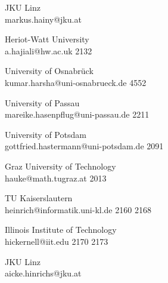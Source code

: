 \begin{multicols}{2}
 {JKU Linz\\}%
 {markus.hainy@jku.at}%
 {} %
 {} %
 {} %
 {} %
 {} %

 {Heriot-Watt University\\}%
 {a.hajiali@hw.ac.uk}%
 {2132} %
 {} %
 {} %
 {} %
 {} %

 {University of Osnabr\"uck\\}%
 {kumar.harsha@uni-osnabrueck.de}%
 {4552} %
 {} %
 {} %
 {} %
 {} %

 {University of Passau\\}%
 {mareike.hasenpflug@uni-passau.de}%
 {2211} %
 {} %
 {} %
 {} %
 {} %

 {University of Potsdam\\}%
 {gottfried.hastermann@uni-potsdam.de}%
 {2091} %
 {} %
 {} %
 {} %
 {} %

 {Graz University of Technology\\}%
 {hauke@math.tugraz.at}%
 {2013} %
 {} %
 {} %
 {} %
 {} %

 {TU Kaiserslautern\\}%
 {heinrich@informatik.uni-kl.de}%
 {2160} %
 {2168} %
 {} %
 {} %
 {} %

 {Illinois Institute of Technology\\}%
 {hickernell@iit.edu}%
 {2170} %
 {2173} %
 {} %
 {} %
 {} %

 {JKU Linz\\}%
 {aicke.hinrichs@jku.at}%
 {} %
 {} %
 {} %
 {} %
 {} %


\end{multicols}
